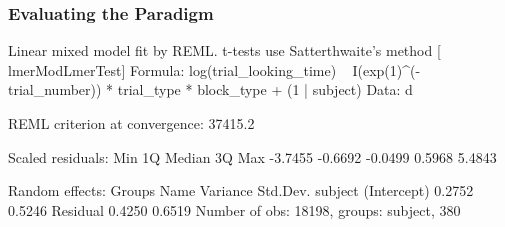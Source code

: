 \documentclass[10pt, letterpaper]{article}
\newenvironment{CodeChunk}{}{}
\begin{document}
\hypertarget{evaluating-the-paradigm}{%
\subsubsection{Evaluating the Paradigm}\label{evaluating-the-paradigm}}

\begin{CodeChunk}
\begin{CodeOutput}
Linear mixed model fit by REML. t-tests use Satterthwaite's method [
lmerModLmerTest]
Formula: log(trial_looking_time) ~ I(exp(1)^(-trial_number)) * trial_type *  
    block_type + (1 | subject)
   Data: d

REML criterion at convergence: 37415.2

Scaled residuals: 
    Min      1Q  Median      3Q     Max 
-3.7455 -0.6692 -0.0499  0.5968  5.4843 

Random effects:
 Groups   Name        Variance Std.Dev.
 subject  (Intercept) 0.2752   0.5246  
 Residual             0.4250   0.6519  
Number of obs: 18198, groups:  subject, 380


\end{CodeOutput}
\end{CodeChunk}
\end{document}
